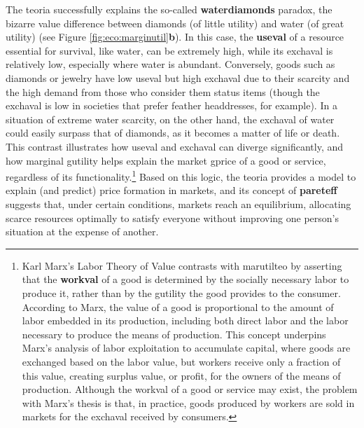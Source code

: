 \documentclass[./main_en.tex]{subfiles}
\begin{document}
\par The \gls{teoria} successfully explains the so-called \textbf{\gls{waterdiamonds}} paradox, the bizarre value difference between diamonds (of little utility) and water (of great utility) (see Figure \ref{fig:eco:marginutil}\textbf{b}). In this case, the \textbf{\gls{useval}} of a resource essential for survival, like water, can be extremely high, while its \gls{exchaval} is relatively low, especially where water is abundant. Conversely, goods such as diamonds or jewelry have low \gls{useval} but high \gls{exchaval} due to their scarcity and the high demand from those who consider them status items (though the \gls{exchaval} is low in societies that prefer feather headdresses, for example). In a situation of extreme water scarcity, on the other hand, the \gls{exchaval} of water could easily surpass that of diamonds, as it becomes a matter of life or death. This contrast illustrates how \gls{useval} and \gls{exchaval} can diverge significantly, and how marginal \gls{gutility} helps explain the market \gls{gprice} of a good or service, regardless of its functionality.\footnote{Karl Marx’s Labor Theory of Value contrasts with \gls{marutilteo} by asserting that the \textbf{\gls{workval}} of a good is determined by the socially necessary labor to produce it, rather than by the \gls{gutility} the good provides to the consumer. According to Marx, the value of a good is proportional to the amount of labor embedded in its production, including both direct labor and the labor necessary to produce the means of production. This concept underpins Marx’s analysis of labor exploitation to accumulate capital, where goods are exchanged based on the labor value, but workers receive only a fraction of this value, creating surplus value, or profit, for the owners of the means of production. Although the \gls{workval} of a good or service may exist, the problem with Marx’s thesis is that, in practice, goods produced by workers are sold in markets for the \gls{exchaval} received by consumers.} Based on this logic, the \gls{teoria} provides a \gls{model} to explain (and predict) price formation in markets, and its concept of \textbf{\gls{pareteff}} suggests that, under certain conditions, markets reach an equilibrium, allocating scarce resources optimally to satisfy everyone without improving one person’s situation at the expense of another.
\end{document}
